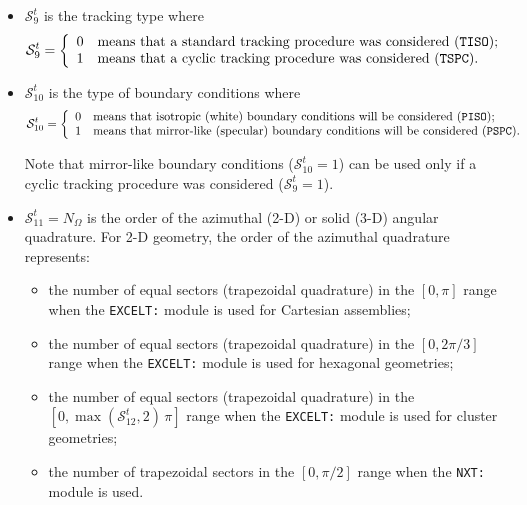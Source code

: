 \begin{itemize}
\item $\mathcal{S}^{t}_{9}$ is the tracking type where
\begin{displaymath}
\mathcal{S}^{t}_{9} = \left\{
\begin{array}{rl}
 0 & \textrm{means that a standard tracking procedure was considered (\moc{TISO});} \\
 1 & \textrm{means that a cyclic tracking procedure was considered  (\moc{TSPC}).} \\
\end{array} \right.
\end{displaymath}

\item $\mathcal{S}^{t}_{10}$ is the type of boundary conditions where
\begin{displaymath}
\mathcal{S}^{t}_{10} = \left\{
\begin{array}{rl}
 0 & \textrm{means that isotropic (white) boundary conditions will be considered (\moc{PISO});} \\
 1 & \textrm{means that mirror-like (specular) boundary conditions will be considered (\moc{PSPC}).} \\
\end{array} \right.
\end{displaymath}

Note that mirror-like boundary conditions ($\mathcal{S}^{t}_{10} = 1$) can be used only if
a cyclic tracking procedure was considered ($\mathcal{S}^{t}_{9} = 1$). 

\item $\mathcal{S}^{t}_{11}=N_\Omega$ is the order of the azimuthal (2-D) or solid (3-D) angular quadrature. For 2-D geometry, the order 
of the azimuthal quadrature represents:
\begin{itemize}
\item the number of equal sectors (trapezoidal quadrature) in the $[0,\pi]$ range when the {\tt EXCELT:} module is
used for Cartesian assemblies; 
\item the number of equal sectors (trapezoidal quadrature) in the $[0,2\pi/3]$ range when the {\tt EXCELT:} module 
is used for hexagonal geometries;
\item the number of equal sectors (trapezoidal quadrature) in the $[0,\max (\mathcal{S}^{t}_{12},2) \, \pi]$ range when the {\tt EXCELT:}
module is used for cluster geometries; 
\item the number of trapezoidal sectors in the $[0,\pi/2]$ range when the {\tt NXT:} module is used. 
\end{itemize}


\end{itemize}
